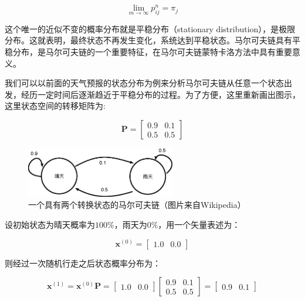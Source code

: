 \begin{equation}
	\lim_{m\rightarrow \infty}p^{n}_{ij}=\pi_j
\end{equation}

\noindent 这个唯一的近似不变的概率分布就是平稳分布（stationary distribution），是极限分布。这就表明，最终状态不再发生变化，系统达到平稳状态。马尔可夫链具有平稳分布，是马尔可夫链的一个重要特征，在马尔可夫链蒙特卡洛方法中具有重要意义。

我们可以以前面的天气预报的状态分布为例来分析马尔可夫链从任意一个状态出发，经历一定时间后逐渐趋近于平稳分布的过程。为了方便，这里重新画出图示，这里状态空间的转移矩阵为:

\begin{equation}
	\mathbf{P}=\begin{bmatrix}
		0.9 & 0.1\\0.5 & 0.5
	\end{bmatrix}
\end{equation}

\begin{figure}
	\sidecaption
	\includegraphics[width=0.58\textwidth]{figures/mc/markov-chain-example}
	\caption{一个具有两个转换状态的马尔可夫链（图片来自Wikipedia）}
	\label{f:mc-markov-chain-1}
\end{figure}

\noindent 设初始状态为晴天概率为$100\%$，雨天为$0\%$，用一个矢量表述为：

\begin{equation}
	\mathbf{x}^{(0)}=\begin{bmatrix}
		1.0&0.0
	\end{bmatrix}
\end{equation}

\noindent 则经过一次随机行走之后状态概率分布为：

\begin{equation}
	\mathbf{x}^{(1)}=\mathbf{x}^{(0)}\mathbf{P}=\begin{bmatrix}
		1.0&0.0 
	\end{bmatrix}\begin{bmatrix}
		0.9&0.1\\0.5&0.5
	\end{bmatrix}=\begin{bmatrix}
		0.9&0.1
	\end{bmatrix}
\end{equation}


